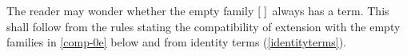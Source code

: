 The reader may wonder whether the empty family ${[\;]}_{}$ always has a
term. This shall follow from the rules stating the compatibility of extension
with the empty families in \autoref{comp-0e} below and from
identity terms (\autoref{identityterms}).
\begin{comment}
When contexts are viewed as statements, the empty context is the statement that
asserts nothing. Likewise, in any context one can assert nothing and this is
achieved by the empty family. 
Since somebody who states nothing asserts it all right, there is a term of the empty
family over any context. Moreover, any two terms of the empty family are always
judgmentally equal.
\begin{align}
& \inference
  { }
  { \jctx{\emptyc}
    }
  \\
& \inference
  { \jctx{\Gamma}
    }
  { \jfam{\Gamma}{\emptyf[\Gamma]}
    }
  \\
& \inference
  { \jctx{\Gamma}
    }
  { \jterm{\Gamma}{\emptyf[\Gamma]}{\emptytm[\Gamma]}
    }
  \\
& \inference
  { \jterm{\Gamma}{\emptyf[\Gamma]}{x}
    }
  { \jtermeq
      {\Gamma}
      {\emptyf[\Gamma]}
      {x}
      {\emptytm[\Gamma]}
    }
  \label{comp-00-t}
\end{align}

The empty context and the empty families together with the operation of
extension will provide several shortcuts for the rest
of the theory of families and terms. This is (in part) obtained by requiring
that a context is exactly the same thing as a family of contexts over the
empty context and that judgmental equality of contexts is exactly the same
as judgmental equality of families of contexts over the empty context. 

\label{comp-00}
Because every context is a family of contexts over the empty context, 
the empty context $\emptyc$ may be considered as a family of contexts over the empty
context. When we do this, we get $\emptyf[\emptyc]$.
\begin{equation}\label{eq:comp-00}
\inference
  { }
  { \jfameq
      {\emptyc}
      {\emptyc}
      {\emptyf[\emptyc]}
    }
\end{equation}
In the future, we shall denote $\emptyf[\Gamma]$ by $\emptyf$. The above rule
guarantees that this will not cause confusion. Likewise, we shall denote
$\emptytm[\Gamma]$ by $\emptytm$.
\end{comment}

